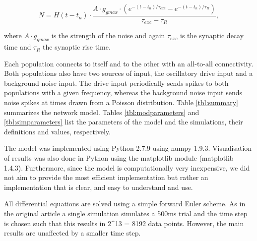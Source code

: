 \documentclass[10pt,a4paper,onecolumn]{article}
\begin{document}
\[N=H(t-t_n) \cdot \frac{A \cdot g _{gmax} \cdot (e^{-(t-t _n)/ \tau _{exc}} - e^{-(t-t _n)/ \tau _R} )}{\tau _{exc} - \tau _R},\]

where \(A \cdot g_{gmax}\) is the strength of the noise and again
\(\tau _{exc}\) is the synaptic decay time and \(\tau_R\) the synaptic
rise time.

Each population connects to itself and to the other with an all-to-all
connectivity. Both populations also have two sources of input, the
oscillatory drive input and a background noise input. The drive input
periodically sends spikes to both populations with a given frequency,
whereas the background noise input sends noise spikes at times drawn
from a Poisson distribution. Table \ref{tbl:summary} summarizes the
network model. Tables \ref{tbl:modparameters} and
\ref{tbl:simparameters} list the parameters of the model and the
simulations, their definitions and values, respectively.

The model was implemented using Python 2.7.9 using numpy 1.9.3.
Visualisation of results was also done in Python using the matplotlib
module (matplotlib 1.4.3). Furthermore, since the model is
computationally very inexpensive, we did not aim to provide the most
efficient implementation but rather an implementation that is clear, and
easy to understand and use.

All differential equations are solved using a simple forward Euler
scheme. As in the original article a single simulation simulates a 500ms
trial and the time step is chosen such that this results in 2\^{}13 =
8192 data points. However, the main results are unaffected by a smaller
time step.
\end{document}
